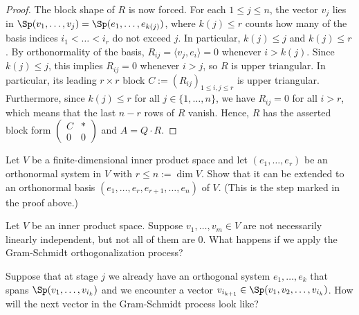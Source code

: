 \begin{proof}
The block shape of $R$ is now forced. For each $1 \le j \le n$, the vector $v_j$ lies in $\Sp(v_1, \dots, v_j) = \Sp(e_1, \dots, e_{k(j)})$, where $k(j) \le r$ counts how many of the basis indices $i_1 < \dots < i_r$ do not exceed $j$. In particular, $k(j) \le j$ and $k(j) \le r$. By orthonormality of the basis, $R_{ij} = \langle v_j, e_i \rangle = 0$ whenever $i > k(j)$. Since $k(j) \le j$, this implies $R_{ij} = 0$ whenever $i > j$, so $R$ is upper triangular. In particular, its leading $r \times r$ block $C := (R_{ij})_{1 \le i, j \le r}$ is upper triangular. Furthermore, since $k(j) \le r$ for all $j \in \{1, \dots, n\}$, we have $R_{ij} = 0$ for all $i > r$, which means that the last $n-r$ rows of $R$ vanish. Hence, $R$ has the asserted block form $\left(\begin{array}{c|c} C & * \\ \hline 0 & 0 \end{array}\right)$ and $A = Q \cdot R$.
\end{proof}

\begin{exercise}
\label{exc:extend_orthonormal_system}
Let $V$ be a finite-di\-men\-sional inner product space and let $(e_1, \dots, e_r)$ be an orthonormal system in $V$ with $r \le n := \dim V$. Show that it can be extended to an orthonormal basis $(e_1, \dots, e_r, e_{r+1}, \dots, e_n)$ of $V$. (This is the step marked  in the proof above.)
\end{exercise}

\begin{exercise}
\label{exc:gram_schmidt_dependent}
Let $V$ be an inner product space. Suppose $v_1, \dots, v_m \in V$ are not necessarily linearly independent, but not all of them are $0$. What happens if we apply the Gram-Schmidt orthogonalization process?

Suppose that at stage $j$ we already have an orthogonal system $e_1, \dots, e_k$ that spans $\Sp(v_1, \dots, v_{i_k})$ and we encounter a vector $v_{i_{k+1}} \in \Sp(v_1, v_2, \dots, v_{i_k})$. How will the next vector in the Gram-Schmidt process look like?
\end{exercise}
